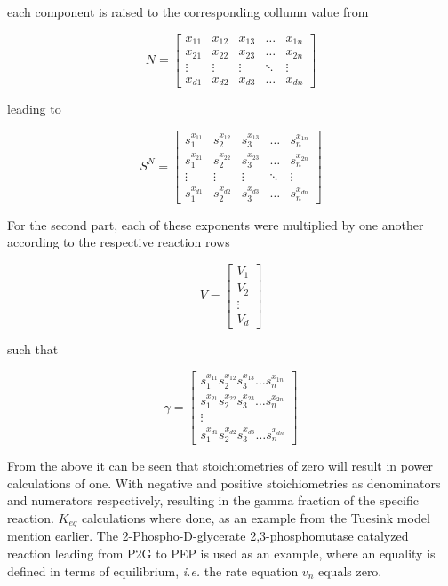 each component is raised to the corresponding collumn value from

\[
N 
=
\begin{bmatrix}
    x_{11} & x_{12} & x_{13} & \dots  & x_{1n} \\
    x_{21} & x_{22} & x_{23} & \dots  & x_{2n} \\
    \vdots & \vdots & \vdots & \ddots & \vdots \\
    x_{d1} & x_{d2} & x_{d3} & \dots  & x_{dn}
\end{bmatrix}
\]

leading to 

\[
S^N
=
\begin{bmatrix}
    s_1^{x_{11}} & s_2^{x_{12}} & s_3^{x_{13}} & \dots  & s_n^{x_{1n}} \\
    s_1^{x_{21}} & s_2^{x_{22}} & s_3^{x_{23}} & \dots  & s_n^{x_{2n}} \\
    \vdots & \vdots & \vdots & \ddots & \vdots \\
    s_1^{x_{d1}} & s_2^{x_{d2}} & s_3^{x_{d3}} & \dots  & s_n^{x_{dn}}
\end{bmatrix}
\]


For the second part, each of these exponents were multiplied by one another according to the respective reaction rows 

\[
V
=
\begin{bmatrix}
    V_{1} \\
    V_{2} \\
    \vdots \\
    V_{d} 
\end{bmatrix}
\]

such that

\[
\gamma 
=
\begin{bmatrix}
    s_1^{x_{11}}s_2^{x_{12}}s_3^{x_{13}} \dots s_n^{x_{1n}} \\
    s_1^{x_{21}}s_2^{x_{22}}s_3^{x_{23}} \dots s_n^{x_{2n}} \\
    \vdots\\
    s_1^{x_{d1}}s_2^{x_{d2}}s_3^{x_{d3}}\dots s_n^{x_{dn}}
\end{bmatrix}
\]

From the above it can be seen that stoichiometries of zero will result in power calculations of one. With negative and positive stoichiometries as denominators and numerators respectively, resulting in the gamma fraction \gamma of the specific reaction. $K_{eq}$ calculations where done, as an example from the Tuesink model mention earlier. The 2-Phospho-D-glycerate 2,3-phosphomutase catalyzed reaction leading from P2G to PEP is used as an example, where an equality is defined in terms of equilibrium, \textit{i.e.} the rate equation $v_n$ equals zero.

